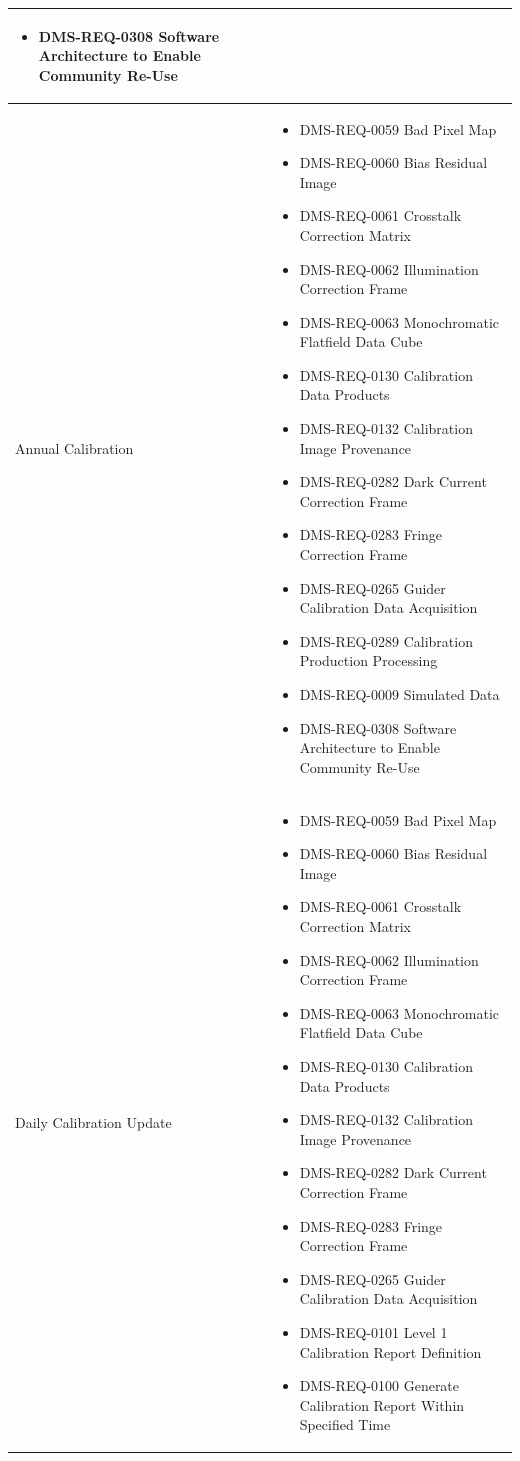 \documentclass[DM,lsstdraft,toc]{lsstdoc}
\begin{document}
\begin{xtabular}{|p{0.1\textwidth}|p{0.85\textwidth}|}
\begin{itemize}
\item DMS-REQ-0308 Software Architecture to Enable Community Re-Use \end{itemize} \\ \hline
Annual Calibration &
\begin{itemize} \item DMS-REQ-0059 Bad Pixel Map
\item DMS-REQ-0060 Bias Residual Image
\item DMS-REQ-0061 Crosstalk Correction Matrix
\item DMS-REQ-0062 Illumination Correction Frame
\item DMS-REQ-0063 Monochromatic Flatfield Data Cube
\item DMS-REQ-0130 Calibration Data Products
\item DMS-REQ-0132 Calibration Image Provenance
\item DMS-REQ-0282 Dark Current Correction Frame
\item DMS-REQ-0283 Fringe Correction Frame
\item DMS-REQ-0265 Guider Calibration Data Acquisition
\item DMS-REQ-0289 Calibration Production Processing
\item DMS-REQ-0009 Simulated Data
\item DMS-REQ-0308 Software Architecture to Enable Community Re-Use \end{itemize} \\ \hline
Daily Calibration Update &
\begin{itemize} \item DMS-REQ-0059 Bad Pixel Map
\item DMS-REQ-0060 Bias Residual Image
\item DMS-REQ-0061 Crosstalk Correction Matrix
\item DMS-REQ-0062 Illumination Correction Frame
\item DMS-REQ-0063 Monochromatic Flatfield Data Cube
\item DMS-REQ-0130 Calibration Data Products
\item DMS-REQ-0132 Calibration Image Provenance
\item DMS-REQ-0282 Dark Current Correction Frame
\item DMS-REQ-0283 Fringe Correction Frame
\item DMS-REQ-0265 Guider Calibration Data Acquisition
\item DMS-REQ-0101 Level 1 Calibration Report Definition
\item DMS-REQ-0100 Generate Calibration Report Within Specified Time

\end{itemize}
\end{xtabular}
\end{document}
